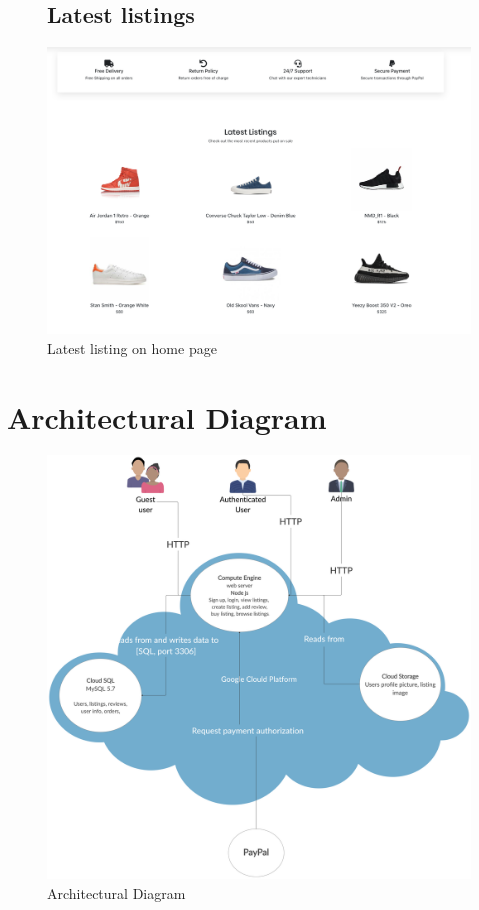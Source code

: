 \documentclass[11pt]{article}
\begin{document}
\begin{figure}[ht!]
    \subsection{Latest listings}
    \centering
    \includegraphics[width=\textwidth,height=0.3\paperheight,keepaspectratio]{Diagrams/External_Interfaces/Latest_Listings.png}
    \caption{Latest listing on home page}
    \label{fig: Latest listings}
\end{figure}
\clearpage

\section{Architectural Diagram}
\begin{figure}[ht!]
    \centering
    \includegraphics[width=\textwidth,height=0.6\paperheight]{Diagrams/Class/Architectural_diagram.png}
    \caption{Architectural Diagram}
    \label{fig: Architectural Diagram}
\end{figure}
\end{document}
